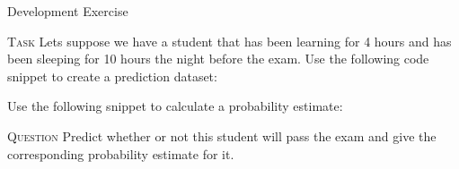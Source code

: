 \documentclass[main.tex]{subfiles}
\begin{document}
    \begin{frame}{Development Exercise }
        \begin{alertblock}{\textsc{Task}}
            Lets suppose we have a student that has been learning for 4 hours and has been sleeping for 10 hours the night before the exam. Use the following code snippet to create a prediction dataset:
            
            
            Use the following snippet to calculate a probability estimate:
            
            
        \end{alertblock}
        \begin{alertblock}{\textsc{Question}}
            Predict whether or not this student will pass the exam and give the corresponding probability estimate for it. 
        \end{alertblock}
    \end{frame}
\end{document}

